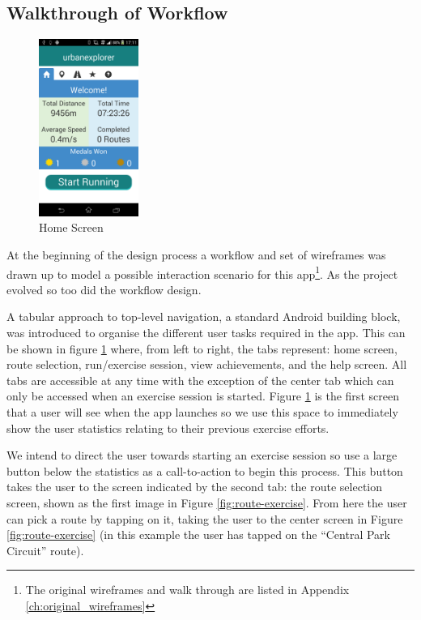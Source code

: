 \newpage

\subsection{Walkthrough of Workflow}
\begin{figure}
  \vspace{-40pt}
  \centering
  \includegraphics[width=0.29\textwidth]{images/screens/home.png}
  \vspace{-20pt}
  \caption{Home Screen}
  \vspace{-25pt}
  \label{fig:home_screen}
\end{figure}
At the beginning of the design process a workflow and set of
wireframes was drawn up to model a possible interaction scenario for 
this app\footnote{The original wireframes and walk through are listed
  in Appendix \ref{ch:original_wireframes}}. As the project evolved so
too did the workflow design. 

A tabular approach to top-level navigation, a standard Android building
block\cite{android_tabs}, was introduced to organise the different user
tasks required in the app. This can be shown in figure
\ref{fig:home_screen} where, from left to right, the tabs represent:
home screen, route selection, run/exercise session, view achievements,
and the help screen. All tabs are accessible at any time with the
exception of the center tab which can only be accessed when an
exercise session is started. Figure \ref{fig:home_screen} is the first
screen that a user will see when the app launches so we use this space
to immediately show the user statistics relating to their previous
exercise efforts.

We intend to direct the user towards starting an exercise session so
use  a large button below the statistics as a call-to-action to begin
this process. This button takes the user to the screen indicated by
the second tab: the route selection screen, shown as the first image
in Figure \ref{fig:route-exercise}. From here the user can pick a
route by tapping on it, taking the user to the center
screen in Figure \ref{fig:route-exercise} (in this example the user
has tapped on the ``Central Park Circuit'' route). 

